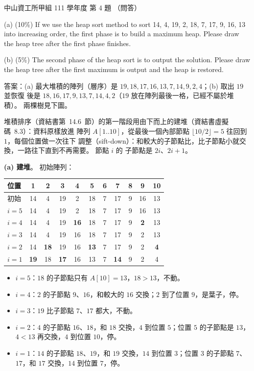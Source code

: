 \begin{pastexam}[label={px:nsysu-111-osds-04}]{中山資工所甲組 111 學年度 第 4 題}
（問答）

(a) (10\%) If we use the heap sort method to sort 14, 4, 19, 2, 18, 7, 17, 9, 16, 13 into
increasing order, the first phase is to build a maximum heap. Please draw the heap tree after the
first phase finishes.

(b) (5\%) The second phase of the heap sort is to output the solution. Please draw the heap tree
after the first maximum is output and the heap is restored.
\end{pastexam}

\begin{pastsoln}
答案：(a) 最大堆積的陣列（層序）是 $19, 18, 17, 16, 13, 7, 14, 9, 2, 4$；(b) 取出 $19$ 並恢復
後是 $18, 16, 17, 9, 13, 7, 14, 4, 2$（$19$ 放在陣列最後一格，已經不屬於堆積）。 兩棵樹見下圖。

堆積排序（資結書第~14.6~節）的第一階段用由下而上的建堆（資結書虛擬碼~8.3）：資料原樣放進
陣列 $A[1..10]$，從最後一個內部節點 $\lfloor 10/2\rfloor = 5$ 往回到 $1$，每個位置做一次往下
調整（sift-down）：和較大的子節點比，比子節點小就交換，一路往下直到不再需要。 節點 $i$ 的
子節點是 $2i$、$2i + 1$。

\textbf{(a) 建堆}。 初始陣列：
\begin{center}
\begin{tabular}{l*{10}{c}}
\toprule
位置 & 1 & 2 & 3 & 4 & 5 & 6 & 7 & 8 & 9 & 10 \\
\midrule
初始 & 14 & 4 & 19 & 2 & 18 & 7 & 17 & 9 & 16 & 13 \\
$i = 5$ & 14 & 4 & 19 & 2 & 18 & 7 & 17 & 9 & 16 & 13 \\
$i = 4$ & 14 & 4 & 19 & \textbf{16} & 18 & 7 & 17 & 9 & \textbf{2} & 13 \\
$i = 3$ & 14 & 4 & 19 & 16 & 18 & 7 & 17 & 9 & 2 & 13 \\
$i = 2$ & 14 & \textbf{18} & 19 & 16 & \textbf{13} & 7 & 17 & 9 & 2 & \textbf{4} \\
$i = 1$ & \textbf{19} & 18 & \textbf{17} & 16 & 13 & 7 & \textbf{14} & 9 & 2 & 4 \\
\bottomrule
\end{tabular}
\end{center}
\begin{itemize}
\item $i = 5$：$18$ 的子節點只有 $A[10] = 13$，$18 > 13$，不動。
\item $i = 4$：$2$ 的子節點 $9$、$16$，和較大的 $16$ 交換；$2$ 到了位置 $9$，是葉子，停。
\item $i = 3$：$19$ 比子節點 $7$、$17$ 都大，不動。
\item $i = 2$：$4$ 的子節點 $16$、$18$，和 $18$ 交換，$4$ 到位置 $5$；位置 $5$ 的子節點是 $13$，
$4 < 13$ 再交換，$4$ 到位置 $10$，停。
\item $i = 1$：$14$ 的子節點 $18$、$19$，和 $19$ 交換，$14$ 到位置 $3$；位置 $3$ 的子節點 $7$、
$17$，和 $17$ 交換，$14$ 到位置 $7$，停。
\end{itemize}


\end{pastsoln}
